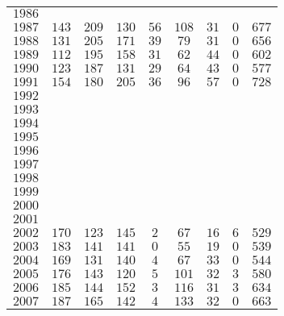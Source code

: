 \begin{longtable}{|l|p{1.1cm}ccccccc|}
    $1986$  &       &       &       &       &       &       &       &       \\
    $1987$  & $143$ & $209$ & $130$ & $56$  & $108$ & $31$  & $0$   & $677$ \\
    $1988$  & $131$ & $205$ & $171$ & $39$  & $79$  & $31$  & $0$   & $656$ \\
    $1989$  & $112$ & $195$ & $158$ & $31$  & $62$  & $44$  & $0$   & $602$ \\
    $1990$  & $123$ & $187$ & $131$ & $29$  & $64$  & $43$  & $0$   & $577$ \\
    $1991$  & $154$ & $180$ & $205$ & $36$  & $96$  & $57$  & $0$   & $728$ \\
    $1992$  &       &       &       &       &       &       &       &       \\
    $1993$  &       &       &       &       &       &       &       &       \\
    $1994$  &       &       &       &       &       &       &       &       \\
    $1995$  &       &       &       &       &       &       &       &       \\
    $1996$  &       &       &       &       &       &       &       &       \\
    $1997$  &       &       &       &       &       &       &       &       \\
    $1998$  &       &       &       &       &       &       &       &       \\
    $1999$  &       &       &       &       &       &       &       &       \\
    $2000$  &       &       &       &       &       &       &       &       \\
    $2001$  &       &       &       &       &       &       &       &       \\
    $2002$  & $170$ & $123$ & $145$ & $2$   & $67$  & $16$  & $6$   & $529$ \\
    $2003$  & $183$ & $141$ & $141$ & $0$   & $55$  & $19$  & $0$   & $539$ \\
    $2004$  & $169$ & $131$ & $140$ & $4$   & $67$  & $33$  & $0$   & $544$ \\
    $2005$  & $176$ & $143$ & $120$ & $5$   & $101$ & $32$  & $3$   & $580$ \\
    $2006$  & $185$ & $144$ & $152$ & $3$   & $116$ & $31$  & $3$   & $634$ \\
    $2007$  & $187$ & $165$ & $142$ & $4$   & $133$ & $32$  & $0$   & $663$ \\

\end{longtable}
